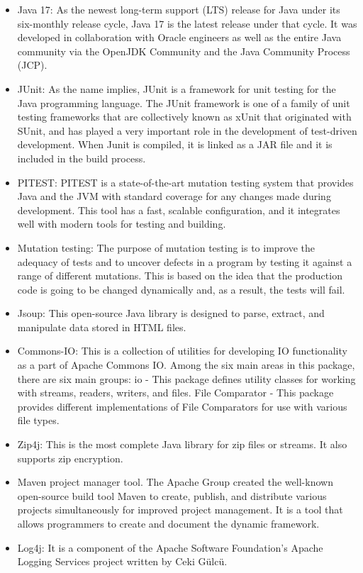 \begin{itemize}
\item Java 17: As the newest long-term support (LTS) release for Java under its six-monthly release cycle, Java 17 is the latest release under that cycle. It was developed in collaboration with Oracle engineers as well as the entire Java community via the OpenJDK Community and the Java Community Process (JCP).
\item JUnit: As the name implies, JUnit is a framework for unit testing for the Java programming language. The JUnit framework is one of a family of unit testing frameworks that are collectively known as xUnit that originated with SUnit, and has played a very important role in the development of test-driven development. When Junit is compiled, it is linked as a JAR file and it is included in the build process.
\item PITEST: PITEST is a state-of-the-art mutation testing system that provides Java and the JVM with standard coverage for any changes made during development. This tool has a fast, scalable configuration, and it integrates well with modern tools for testing and building.
\item Mutation testing: The purpose of mutation testing is to improve the adequacy of tests and to uncover defects in a program by testing it against a range of different mutations. This is based on the idea that the production code is going to be changed dynamically and, as a result, the tests will fail.
\item Jsoup: This open-source Java library is designed to parse, extract, and manipulate data stored in HTML files.
\item Commons-IO: This is a collection of utilities for developing IO functionality as a part of Apache Commons IO. Among the six main areas in this package, there are six main groups: io - This package defines utility classes for working with streams, readers, writers, and files. File Comparator - This package provides different implementations of File Comparators for use with various file types.
\item Zip4j: This is the most complete Java library for zip files or streams. It also supports zip encryption.
\item Maven project manager tool. The Apache Group created the well-known open-source build tool Maven to create, publish, and distribute various projects simultaneously for improved project management. It is a tool that allows programmers to create and document the dynamic framework.
\item Log4j: It is a component of the Apache Software Foundation's Apache Logging Services project written by Ceki Gülcü.  
\end{itemize}

